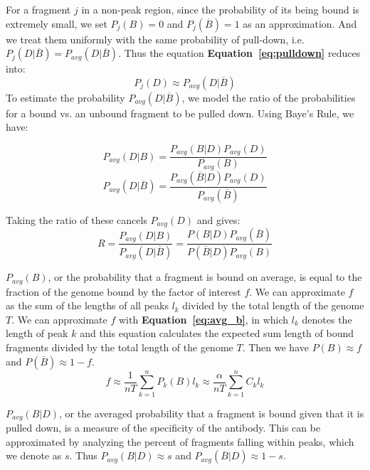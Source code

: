 \documentclass[12pt]{article}
\begin{document}
For a fragment $j$ in a non-peak region, since the probability of its being bound is extremely small, we set $P_j(B) = 0$ and $P_j(\overline{B}) = 1$ as an approximation.
And we treat them uniformly with the same probability of pull-down, i.e. $P_{j}(D|\overline{B}) = P_{avg}(D|\overline{B})$.
Thus the equation \textbf{Equation~\ref{eq:pulldown}} reduces into:
\begin{equation} \label{eq:pulldown_nonpeak}
    P_j(D) \approx P_{avg}(D|\overline{B})
\end{equation}
To estimate the probability $P_{avg}(D|\overline{B})$, we model the ratio of the probabilities for a bound vs. an unbound fragment to be pulled down. Using Baye's Rule, we have:

\begin{equation} \label{eq:bayesPDB}
    P_{avg}(D|B) = \frac{P_{avg}(B|D)P_{avg}(D)}{P_{avg}(B)}
\end{equation}
\begin{equation} \label{eq:bayesPDUB}
    P_{avg}(D|\overline{B}) = \frac{P_{avg}(\overline{B}|D)P_{avg}(D)}{P_{avg}(\overline{B})}
\end{equation}

Taking the ratio of these cancels $P_{avg}(D)$ and gives:
\begin{equation} \label{eq:ratio}
  R = \frac{P_{avg}(D|B)}{P_{avg}(D|\overline{B})} = \frac{P(B|D)P_{avg}(\overline{B})}{P(\overline{B}|D)P_{avg}(B)}
\end{equation}

$P_{avg}(B)$, or the probability that a fragment is bound on average, is equal to the fraction of the genome bound by the factor of interest $f$.
We can approximate $f$ as the sum of the lengths of all peaks $l_k$ divided by the total length of the genome $T$.
We can approximate $f$ with \textbf{Equation~\ref{eq:avg_b}}, in which $l_k$ denotes the length of peak $k$ and this equation calculates the expected sum length of bound fragments divided by the total length of the genome $T$. Then we have $P(B) \approx f$ and $P(\overline{B}) \approx 1-f$.
\begin{equation} \label{eq:avg_b}
  f \approx \frac{1}{nT} \sum_{k=1}^{n} P_k(B) l_k \approx \frac{\alpha}{nT} \sum_{k=1}^{n} C_k l_k
\end{equation}


$P_{avg}(B|D)$, or the averaged probability that a fragment is bound given that it is pulled down, is a measure of the specificity of the antibody. This can be approximated by analyzing the percent of fragments falling within peaks, which we denote as $s$.
Thus $P_{avg}(B|D) \approx s$ and $P_{avg}(\overline{B}|D) \approx 1-s$.
\end{document}

